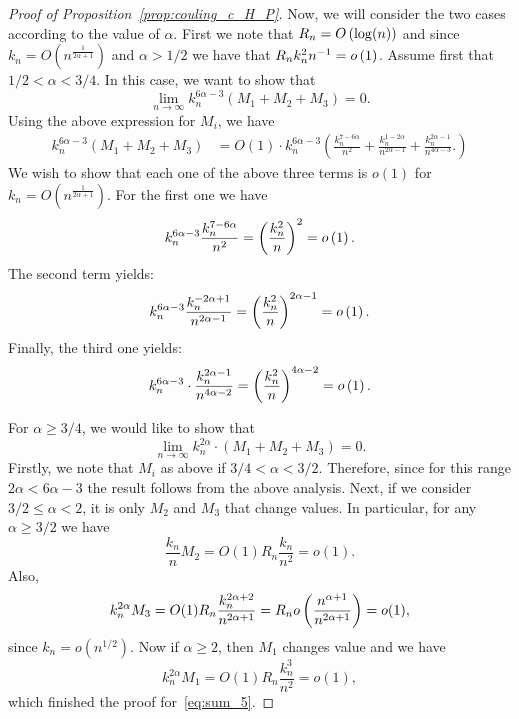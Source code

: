 \begin{proof}[Proof of Proposition~\ref{prop:couling_c_H_P}]
Now, we will consider the two cases according to the value of $\alpha$. First we note that $R_n = O\left(\log(n)\right)$ and since
$k_n = O(n^{\frac{1}{2\alpha +1}})$ and $\alpha > 1/2$ we have that $R_n k_n^2 n^{-1} = o\left(1\right)$.
Assume first that $1/2 < \alpha < 3/4$. In this case, we want to show that 
\begin{equation} \label{eq:int3_to_prove_I}
\lim_{n \to \infty} k_n^{6\alpha -3} (M_1 + M_2 + M_3) = 0. 
\end{equation}
Using the above expression for $M_i$, we have 
\begin{align*} 
 k_n^{6\alpha -3} (M_1 + M_2 + M_3) &= O(1) \cdot  
 k_n^{6\alpha -3} 
\left( 
\frac{k_n^{7-6\alpha}}{n^2} + \frac{k_n^{1-2\alpha}}{n^{2\alpha-1}} 
+\frac{k_n^{2\alpha-1}}{n^{4\alpha - 3}}.
\right) 
\end{align*}
We wish to show that each one of the above three terms is $o(1)$ for $k_n = O(n^{\frac{1}{2\alpha +1}})$. 
For the first one we have 
\[ 
	k_n^{6\alpha -3} \frac{k_n^{7-6\alpha}}{n^2} = \left(\frac{k_n^{2}}{n}\right)^2 = o\left(1\right). 
\]
The second term yields: 
\[
	k_n^{6\alpha -3}  \frac{k_n^{-2\alpha+1}}{n^{2\alpha-1}} = \left(\frac{k_n^2}{n}\right)^{2\alpha - 1} = o\left(1\right).
\]
Finally, the third one yields: 
\[
	k_n^{6\alpha -3} \cdot \frac{k_n^{2\alpha -1}}{n^{4\alpha - 2}}  
	= \left(\frac{k_n^2}{n}\right)^{4\alpha - 2} = o\left(1\right).
\]
 
For $\alpha \ge 3/4$, we would like to show that 
\begin{equation} \label{eq:int3_to_prove_II}
\lim_{n \to \infty} k_n^{2\alpha} \cdot (M_1 + M_2 + M_3) = 0. 
\end{equation}
Firstly, we note that $M_i$ as above if $3/4 < \alpha < 3/2$. Therefore, since for this range $2 \alpha <6\alpha - 3$ the result follows from the above analysis. Next, if we consider $3/2 \leq \alpha <2$, it is only $M_2$ and $M_3$ that change values. In particular, for any $\alpha \geq 3/2$ we have 
\[
	\frac{k_n}{n}  M_2 =O(1) R_n \frac{k_n}{n^2} = o(1).
\]
Also,
\[
	k_n^{2\alpha }  M_3 = O(1) R_n \frac{k_n^{2\alpha + 2}}{n^{2\alpha + 1}}
	= R_n o\left(\frac{n^{\alpha + 1}}{n^{2\alpha +1}}\right) = o(1),
\]
since $k_n = o(n^{1/2})$. Now if $\alpha \geq 2$, then $M_1$ changes value and we have 
\[
	k_n^{2\alpha} M_1 =O(1) R_n \frac{k_n^3}{n^2} = o(1),
\] 
which finished the proof for~\eqref{eq:sum_5}.




\end{proof}
